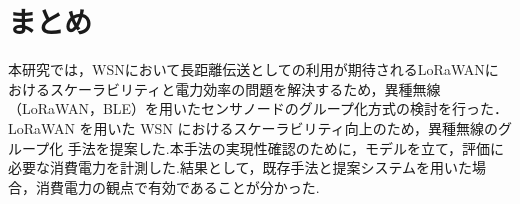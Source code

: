 \section{まとめ}
本研究では，WSNにおいて長距離伝送としての利用が期待されるLoRaWANにおけるスケーラビリティと電力効率の問題を解決するため，異種無線（LoRaWAN，BLE）を用いたセンサノードのグループ化方式の検討を行った．
LoRaWAN を用いた WSN におけるスケーラビリティ向上のため，異種無線のグループ化 手法を提案した.本手法の実現性確認のために，モデルを立て，評価に必要な消費電力を計測した.結果として，既存手法と提案システムを用いた場合，消費電力の観点で有効であることが分かった.